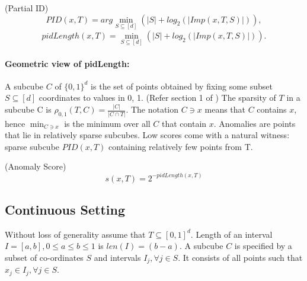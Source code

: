 \begin{defn}
    \label{defn:partial-ids}
    (Partial ID) 
    \vspace{-1em}
    \begin{equation}
        \label{eq:PID}
        PID(x,T) = arg \min_{S \subseteq [d]} 
    (\vert S \vert + log_{2}(\vert Imp(x, T, S) \vert)),
    \end{equation}
    \vspace{-2em}
    \begin{equation}
        \label{eq:pidLength}
        pidLength(x,T) = \min_{S \subseteq [d]} 
    (\vert S \vert + log_{2}(\vert Imp(x, T, S) \vert)).
    \end{equation}
\end{defn}


\paragraph{Geometric view of pidLength:}
A subcube $C$ of $\{0, 1\}^d$ is the set of points obtained by fixing some subset $S \subseteq [d]$ coordinates to values in 0, 1. (Refer section 1 of \cite{ellis_2011})
The sparsity of $T$ in a subcube C is $\rho_{0,1}(T, C) = \frac{\vert C \vert}{\vert C \cap T\vert}$.
The notation $C \ni x$ means that $C$ contains $x$, hence $\min_{C \ni x}$ is the minimum over all $C$ that contain $x$.
Anomalies are points that lie in relatively sparse subcubes.
Low scores come with a natural witness: sparse subcube $PID(x, T)$ containing relatively few points from T\@.

\begin{defn}
    \label{defn:pidforest-anomaly-score}
    (Anomaly Score)
    \vspace{-1em}
    \begin{equation}
        \label{eq:pidforest-anomaly-score}
        s(x,T) = 2^{-pidLength(x,T)}
    \end{equation}
\end{defn}

\subsection{Continuous Setting}
\label{subsec:continuous-setting}

Without loss of generality assume that $T \subseteq [0,1]^d$.
Length of an interval $I = [a,b], 0 \leq a \leq b \leq 1$ is $len(I) = (b-a)$.
A subcube $C$ is specified by a subset of co-ordinates $S$ and intervals $I_j, \forall j \in S$.
It consists of all points such that $x_j \in I_j, \forall j \in S$.

